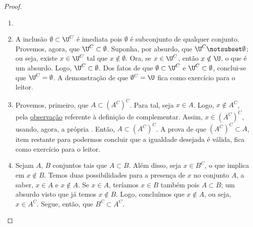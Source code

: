 \begin{proof}
\begin{enumerate}
\item[]
\item
A inclusão $\emptyset \subset \U^C$ é imediata pois $\emptyset$ é subconjunto de qualquer conjunto. 
Provemos, agora, que $\U^C \subset \emptyset$.
Suponha, por absurdo, que $\U^C \notsubset \emptyset$; ou seja, existe $x \in \U^C$ tal que $x \notin \emptyset$.
Ora, se $x \in \U^C$, então $x \notin \U$, o que é um absurdo.
Logo, $\U^C \subset \emptyset$.
Dos fatos de que $\emptyset \subset \U^C$ e $\U^C \subset \emptyset$, conclui-se que $\U^C = \emptyset$.
A demonstração de que $\emptyset^C = \U$ fica como exercício para o leitor.

\item
Provemos, primeiro, que $A \subset (A^C)^C$.
Para tal, seja $x \in A$.
Logo, $x \notin A^C$, pela \hyperref[obs:def-complementar]{observação} referente à definição de complementar.
Assim, $x \in (A^C)^C$, usando, agora, a própria .
Então, $A \subset (A^C)^C$.
A prova de que $(A^C)^C \subset A$, item restante para podermos concluir que a igualdade desejada é válida, fica como exercício para o leitor.

\item
Sejam $A$, $B$ conjuntos tais que $A \subset B$.
Além disso, seja $x \in B^C$, o que implica em $x \notin B$.
Temos duas possibilidades para a presença de $x$ no conjunto $A$, a saber, $x \in A$ e $x \notin A$.
Se $x \in A$, teríamos $x \in B$ também pois $A \subset B$; um absurdo visto que já temos $x \notin B$.
Logo, concluímos que $x \notin A$, ou seja, $x \in A^C$.
Segue, então, que $B^C \subset A^C$.
\end{enumerate}
\end{proof}


